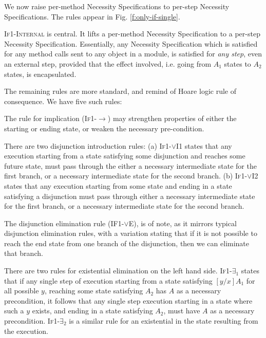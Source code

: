 We now raise per-method Necessity Specifications 
to per-step Necessity Specifications. 
The rules appear in Fig. \ref{f:only-if-single}.

\textsc{If1-Internal} is central. It
 lifts a per-method Necessity Specification to a per-step Necessity Specification.
Essentially, any Necessity Specification which is satisfied for any method
calls sent to any object in a module, is satisfied for \emph{any step}, even
an external step, provided that the effect involved, i.e. going from $A_1$ states to
$A_2$ states, is encapsulated.

 The remaining rules are more standard, and remind of Hoare logic rule of consequence.
 We have five such rules:
 
The  rule for implication (\textsc{If1-$\longrightarrow$}) may strengthen
 properties of either the starting or ending state, or 
weaken the necessary pre-condition. 

There are two disjunction introduction rules: 
(a) \textsc{If1-$\vee$I1} states that any execution
starting from a state satisfying some disjunction and reaches some future state, 
must pass through the either a necessary 
intermediate state for the first branch, or a necessary 
intermediate state for the second branch.
(b) \textsc{If1-$\vee$I2} states that any execution 
starting from some state and ending in a state satisfying a disjunction
must pass through either a necessary intermediate state for 
the first branch, or a necessary intermediate state for the second branch.


The disjunction
elimination rule (\textsc{IF1-$\vee$E}), 
is of note, as it mirrors typical disjunction elimination
rules, with a variation stating that if it is not possible  to reach 
the end state from one branch of the disjunction, then we can eliminate 
that branch. 

There are two rules for existential elimination on the left hand side.
\textsc{If1-$\exists_1$} states that if any single step of execution starting
from a state satisfying $[y/x]A_1$ for all possible $y$, reaching some state satisfying
$A_2$ has $A$ as a necessary precondition, it follows that any single step execution
starting in a state where such a $y$ exists, and ending in a state satisfying $A_2$,
must have $A$ as a necessary precondition. \textsc{If1-$\exists_2$} is a similar rule
for an existential in the state resulting from the execution.


